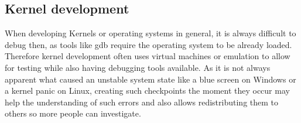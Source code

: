 \subsection{Kernel development}
When developing Kernels or operating systems in general,
it is always difficult to debug then, as tools like gdb require the operating system to be already loaded.
Therefore kernel development often uses virtual machines or emulation
to allow for testing while also having debugging tools available.
As it is not always apparent what caused an unstable system state
like a blue screen on Windows or a kernel panic on Linux,
creating such checkpoints the moment they occur may help the understanding of such errors
and also allows redistributing them to others so more people can investigate.
